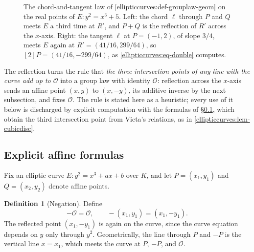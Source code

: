 \documentclass[11pt,a4paper]{article}
\theoremstyle{definition}
\newtheorem{definition}[theorem]{Definition}
\theoremstyle{remark}
\begin{document}
\begin{figure}[htbp]
\caption{The chord-and-tangent law of
\cref{ellipticcurves:def-grouplaw-geom} on the real points of
\(E : y^2 = x^3 + 5\). Left: the chord \(\ell\) through \(P\) and \(Q\)
meets \(E\) a third time at \(R'\), and \(P + Q\) is the reflection of
\(R'\) across the \(x\)-axis. Right: the tangent \(\ell\) at
\(P = (-1, 2)\), of slope \(3/4\), meets \(E\) again at
\(R' = (41/16, 299/64)\), so \([2]P = (41/16, -299/64)\), as
\eqref{ellipticcurves:eq-double} computes.}
\label{fig:ellipticcurves-chordtangent}
\end{figure}

The reflection turns the rule that \emph{the three intersection points of
any line with the curve add up to \(\mathcal{O}\)} into a group law with
identity \(\mathcal{O}\): reflection across the \(x\)-axis sends an
affine point \((x, y)\) to \((x, -y)\), its additive inverse by the next
subsection, and fixes \(\mathcal{O}\). The rule is stated here as a
heuristic; every use of it below is discharged by explicit computation
with the formulas of \S\ref{ellipticcurves:subsec-formulas}, which obtain
the third intersection point from Vieta's relations, as in
\cref{ellipticcurves:lem-cubicdisc}.

\subsection{Explicit affine formulas}\label{ellipticcurves:subsec-formulas}

Fix an elliptic curve \(E : y^2 = x^3 + ax + b\) over \(K\), and let
\(P = (x_1, y_1)\) and \(Q = (x_2, y_2)\) denote affine points.

\begin{definition}[Negation]\label{ellipticcurves:def-negation}
Define
\[
  -\mathcal{O} = \mathcal{O}, \qquad -(x_1, y_1) = (x_1, -y_1) .
\]
The reflected point \((x_1, -y_1)\) is again on the curve, since the
curve equation depends on \(y\) only through \(y^2\). Geometrically,
the line through \(P\) and \(-P\) is the vertical line \(x = x_1\),
which meets the curve at \(P\), \(-P\), and \(\mathcal{O}\).
\end{definition}
\end{document}
